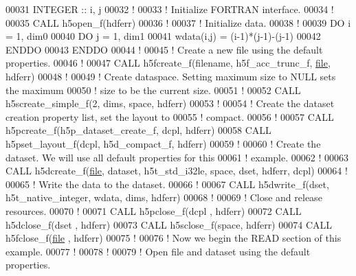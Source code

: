 \begin{DoxyCode}
00031   \textcolor{keywordtype}{INTEGER} :: i, j
00032   \textcolor{comment}{!}
00033   \textcolor{comment}{! Initialize FORTRAN interface.}
00034   \textcolor{comment}{!}
00035   \textcolor{keyword}{CALL }h5open\_f(hdferr)
00036   \textcolor{comment}{!}
00037   \textcolor{comment}{! Initialize data.}
00038   \textcolor{comment}{!}
00039   \textcolor{keywordflow}{DO} i = 1, dim0
00040      \textcolor{keywordflow}{DO} j = 1, dim1
00041         wdata(i,j) = (i-1)*(j-1)-(j-1)
00042 \textcolor{keywordflow}{     ENDDO}
00043 \textcolor{keywordflow}{  ENDDO}
00044   \textcolor{comment}{!}
00045   \textcolor{comment}{! Create a new file using the default properties.}
00046   \textcolor{comment}{!}
00047   \textcolor{keyword}{CALL }h5fcreate\_f(filename, h5f\_acc\_trunc\_f, \hyperlink{structfile}{file}, hdferr)
00048   \textcolor{comment}{!}
00049   \textcolor{comment}{! Create dataspace.  Setting maximum size to NULL sets the maximum}
00050   \textcolor{comment}{! size to be the current size.}
00051   \textcolor{comment}{!}
00052   \textcolor{keyword}{CALL }h5screate\_simple\_f(2, dims, space, hdferr)
00053   \textcolor{comment}{!}
00054   \textcolor{comment}{! Create the dataset creation property list, set the layout to}
00055   \textcolor{comment}{! compact.}
00056   \textcolor{comment}{!}
00057   \textcolor{keyword}{CALL }h5pcreate\_f(h5p\_dataset\_create\_f, dcpl, hdferr)
00058   \textcolor{keyword}{CALL }h5pset\_layout\_f(dcpl, h5d\_compact\_f, hdferr)
00059   \textcolor{comment}{!}
00060   \textcolor{comment}{! Create the dataset.  We will use all default properties for this}
00061   \textcolor{comment}{! example.}
00062   \textcolor{comment}{!}
00063   \textcolor{keyword}{CALL }h5dcreate\_f(\hyperlink{structfile}{file}, dataset, h5t\_std\_i32le, space, dset, hdferr, dcpl)
00064   \textcolor{comment}{!}
00065   \textcolor{comment}{! Write the data to the dataset.}
00066   \textcolor{comment}{!}
00067   \textcolor{keyword}{CALL }h5dwrite\_f(dset, h5t\_native\_integer, wdata, dims, hdferr)
00068   \textcolor{comment}{!}
00069   \textcolor{comment}{! Close and release resources.}
00070   \textcolor{comment}{!}
00071   \textcolor{keyword}{CALL }h5pclose\_f(dcpl , hdferr)
00072   \textcolor{keyword}{CALL }h5dclose\_f(dset , hdferr)
00073   \textcolor{keyword}{CALL }h5sclose\_f(space, hdferr)
00074   \textcolor{keyword}{CALL }h5fclose\_f(\hyperlink{structfile}{file} , hdferr)
00075   \textcolor{comment}{!}
00076   \textcolor{comment}{! Now we begin the READ section of this example.}
00077   \textcolor{comment}{!}
00078   \textcolor{comment}{!}
00079   \textcolor{comment}{! Open file and dataset using the default properties.}

\end{DoxyCode}
